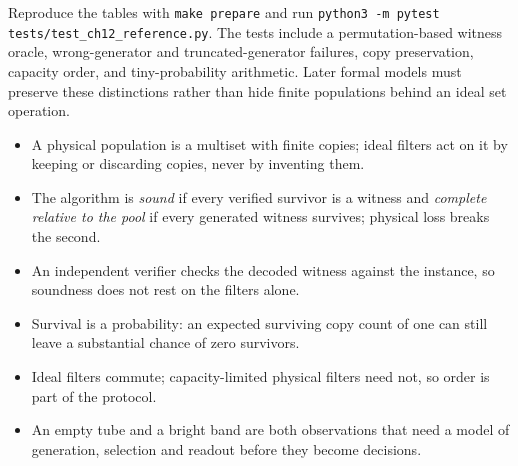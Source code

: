 Reproduce the tables with \texttt{make prepare}
and run \texttt{python3 -m pytest tests/test\_ch12\_reference.py}. The tests include a
permutation-based witness oracle, wrong-generator and truncated-generator
failures, copy preservation, capacity order, and tiny-probability arithmetic.
Later formal models must preserve these distinctions rather than hide finite
populations behind an ideal set operation.

\begin{KeyIdeas}
\begin{itemize}\setlength{\itemsep}{2pt}
\item A physical population is a multiset with finite copies; ideal filters act
on it by keeping or discarding copies, never by inventing them.
\item The algorithm is \emph{sound} if every verified survivor is a witness and
\emph{complete relative to the pool} if every generated witness survives; physical
loss breaks the second.
\item An independent verifier checks the decoded witness against the instance,
so soundness does not rest on the filters alone.
\item Survival is a probability: an expected surviving copy count of one can
still leave a substantial chance of zero survivors.
\item Ideal filters commute; capacity-limited physical filters need not, so order
is part of the protocol.
\item An empty tube and a bright band are both observations that need a model of
generation, selection and readout before they become decisions.
\end{itemize}
\end{KeyIdeas}

